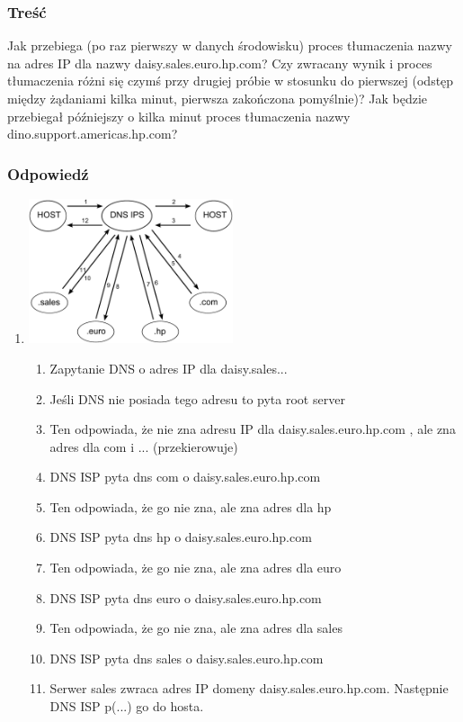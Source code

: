 \documentclass[a4paper,twoside]{article}
\begin{document}
\subsubsection{Treść}
Jak przebiega (po raz pierwszy w danych środowisku) proces tłumaczenia nazwy na adres IP dla nazwy daisy.sales.euro.hp.com? Czy zwracany wynik i proces tłumaczenia różni się czymś przy drugiej próbie w stosunku do pierwszej (odstęp między żądaniami kilka minut, pierwsza zakończona pomyślnie)? Jak będzie przebiegał późniejszy o kilka minut proces tłumaczenia nazwy dino.support.americas.hp.com?
\subsubsection{Odpowiedź}
\begin{enumerate}[A]
	\item \includegraphics[width=6cm]{./images/zadanie01.pdf}\\
	\begin{enumerate}[1]
		\item Zapytanie DNS o adres IP dla daisy.sales...
		\item Jeśli DNS nie posiada tego adresu to pyta root server
		\item Ten odpowiada, że nie zna adresu IP dla daisy.sales.euro.hp.com , ale zna adres dla com i ... (przekierowuje)
		\item DNS ISP pyta dns com o daisy.sales.euro.hp.com
		\item Ten odpowiada, że go nie zna, ale zna adres dla hp
		\item DNS ISP pyta dns hp o daisy.sales.euro.hp.com
		\item Ten odpowiada, że go nie zna, ale zna adres dla euro
		\item DNS ISP pyta dns euro o daisy.sales.euro.hp.com
		\item Ten odpowiada, że go nie zna, ale zna adres dla sales
		\item DNS ISP pyta dns sales o daisy.sales.euro.hp.com
		\item Serwer sales zwraca adres IP domeny daisy.sales.euro.hp.com. Następnie DNS ISP p(...) go do hosta.

\end{enumerate}
\end{enumerate}
\end{document}

